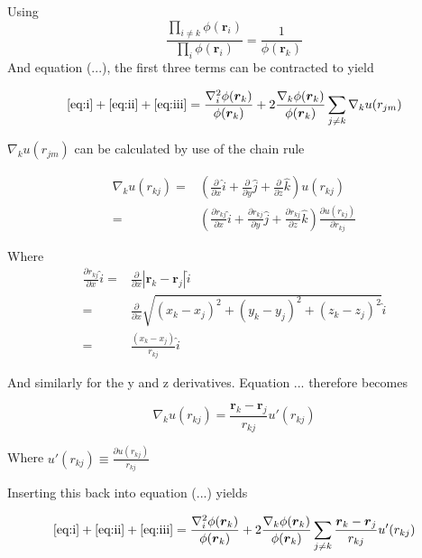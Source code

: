 \documentclass[
    a4paper, aps, twocolumn, floatfix, superscriptaddress,
    nofootinbib]{revtex4-1}
\begin{document}
\begin{appendices}
Using 
\begin{equation*}
    \frac{\prod_{i \neq k} \phi(\boldsymbol{r}_i)}{\prod_i \phi(\boldsymbol{r}_i)} = \frac{1}{\phi(\boldsymbol{r}_k)}
\end{equation*}
And equation (...), the first three terms can be contracted to yield

\begin{equation*}
    \eqref{eq:i}+\eqref{eq:ii} + \eqref{eq:iii} = \frac{\nabla_i^2 \phi(\boldsymbol{r}_k)}{\phi(\boldsymbol{r}_k)} + 2\frac{\nabla_k \phi(\boldsymbol{r}_k)}{\phi(\boldsymbol{r}_k)} \sum_{j\neq k} \nabla_k u(r_{jm})
\end{equation*}

$\nabla_k u(r_{jm})$ can be calculated by use of the chain rule

\begin{align*}
    \nabla_k u(r_{kj}) =& \left( \frac{\partial}{\partial x} \hat{i} + \frac{\partial}{\partial y} \hat{j} + \frac{\partial}{\partial z} \hat{k} \right) u(r_{kj}) \\
    = &\left( \frac{\partial r_{kj}}{\partial x} \hat{i} + \frac{\partial r_{kj}}{\partial y} \hat{j} + \frac{\partial r_{kj}}{\partial z} \hat{k} \right) \frac{\partial u(r_{kj})}{\partial r_{kj}}
\end{align*}

 Where
\begin{align*}
    \frac{\partial r_{kj}}{\partial x} \hat{i} =& \frac{\partial}{\partial x} \left| \boldsymbol{r}_k - \boldsymbol{r}_j \right|\hat{i} \\
    =& \frac{\partial}{\partial x} \sqrt{(x_k-x_j)^2+(y_k-y_j)^2+(z_k-z_j)^2} \hat{i}  \\
    =& \frac{(x_k-x_j)}{r_{kj}} \hat{i}
\end{align*}

And similarly for the y and z derivatives. Equation ... therefore becomes 


\begin{equation*}
    \nabla_k u(r_{kj}) = \frac{\boldsymbol{r}_k-\boldsymbol{r}_j}{r_{kj}} u'(r_{kj})
\end{equation*}

Where $u'(r_{kj}) \equiv  \frac{\partial u(r_{kj})}{r_{kj}}$

Inserting this back into equation (...) yields 

\begin{equation*}
     \eqref{eq:i}+\eqref{eq:ii} + \eqref{eq:iii} = \frac{\nabla_i^2 \phi(\boldsymbol{r}_k)}{\phi(\boldsymbol{r}_k)} + 2\frac{\nabla_k \phi(\boldsymbol{r}_k)}{\phi(\boldsymbol{r}_k)} \sum_{j\neq k} \frac{\boldsymbol{r}_k-\boldsymbol{r}_j}{r_{kj}} u'(r_{kj})
\end{equation*}


\end{appendices}
\end{document}
